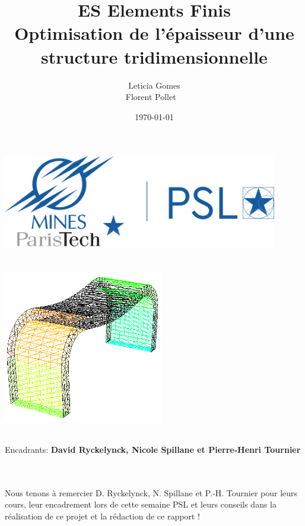 \title{\Large ES Elements Finis  \\[0.5cm]
        \bf\Large Optimisation de l'épaisseur d'une structure tridimensionnelle}
\author{\large Leticia Gomes\\Florent Pollet \ \\}
\date{\large\today}

\makeatletter
    \begin{titlepage}
        \begin{center}
	   { \includegraphics[width=12cm]{imgs/mp_logo.png}}
	   {\ \\ \ \\}
        \vbox{}\vspace{2cm}
            {\@title }\\[1cm] 
            { \includegraphics[width=7cm]{imgs/cover.PNG}}\\[1cm]
            {\@author}

            {\large \ \\ Encadrants: \bf David Ryckelynck, Nicole Spillane et Pierre-Henri Tournier\\ \ \\}
            {\@date\\}

        \end{center}

    \end{titlepage}

        
    \begin{remerciements}
        Nous tenons à remercier D. Ryckelynck, N. Spillane et P.-H. Tournier pour leurs cours, leur encadrement lors de cette semaine PSL et leurs conseils dans la réalisation
        de ce projet et la rédaction de ce rapport !
    \end{remerciements}


    \tableofcontents


    \clearpage
\makeatother